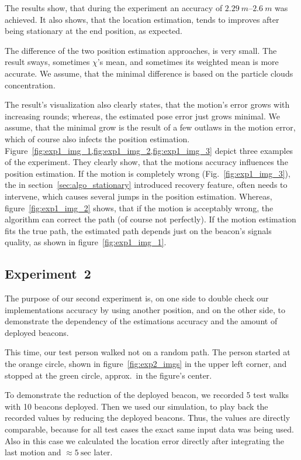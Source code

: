 The results show, that during the experiment an accuracy of $2.29~m$--$2.6~m$ was achieved. It also shows, that the location estimation, tends to improves after being stationary at the end position, as expected.

The difference of the two position estimation approaches, is very small. The result sways, sometimes $\chi$'s mean, and sometimes its weighted mean is more accurate. We assume, that the minimal difference is based on the particle clouds concentration.

The result's visualization also clearly states, that the motion's error grows with increasing rounds; whereas, the estimated pose error just grows minimal. We assume, that the minimal grow is the result of a few outlaws in the motion error, which of course also infects the position estimation. Figure~\ref{fig:exp1_img_1,fig:exp1_img_2,fig:exp1_img_3} depict three examples of the experiment. They clearly show, that the motions accuracy influences the position estimation. If the motion is completely wrong (Fig.\ \ref{fig:exp1_img_3}), the in section~\ref{sec:algo_stationary} introduced recovery feature, often needs to intervene, which causes several jumps in the position estimation. Whereas, figure~\ref{fig:exp1_img_2} shows, that if the motion is acceptably wrong, the algorithm can correct the path (of course not perfectly). If the motion estimation fits the true path, the estimated path depends just on the beacon's signals quality, as shown in figure~\ref{fig:exp1_img_1}.

\subsection*{Experiment~2}
The purpose of our second experiment is, on one side to double check our implementations accuracy by using another position, and on the other side, to demonstrate the dependency of the estimations accuracy and the amount of deployed beacons.

This time, our test person walked not on a random path. The person started at the orange circle, shown in figure~\ref{fig:exp2_imgs} in the upper left corner, and stopped at the green circle, approx.\ in the figure's center.

To demonstrate the reduction of the deployed beacon, we recorded 5 test walks with 10 beacons deployed. Then we used our simulation, to play back the recorded values by reducing the deployed beacons. Thus, the values are directly comparable, because for all test cases the exact same input data was being used. Also in this case we calculated the location error directly after integrating the last motion and $\approx 5~\text{sec}$ later.

